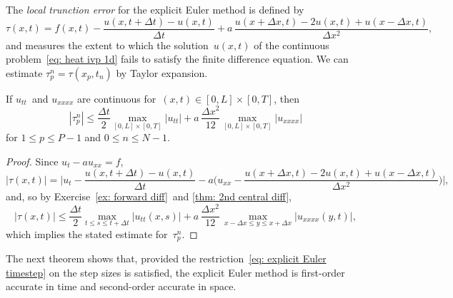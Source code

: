 The \emph{local trunction error} for the explicit Euler method is defined by
\begin{equation}\label{eq: tau explicit Euler}
\tau(x,t)=f(x,t)-\frac{u(x,t+\Delta t)-u(x,t)}{\Delta t}
	+a\,\frac{u(x+\Delta x,t)-2u(x,t)+u(x-\Delta x,t)}{\Delta x^2},
\end{equation}
and measures the extent to which the solution~$u(x,t)$ of the continuous 
problem~\eqref{eq: heat ivp 1d} fails to satisfy the finite difference equation.
We can estimate $\tau^n_p=\tau(x_p,t_n)$ by Taylor expansion.

\begin{lemma}\label{lem: tau explicit Euler}
If $u_{tt}$~and $u_{xxxx}$ are continuous for~$(x,t)\in[0,L]\times[0,T]$, then
\[
|\tau^n_p|\le\frac{\Delta t}{2}\max_{[0,L]\times[0,T]}|u_{tt}|
	+a\,\frac{\Delta x^2}{12}\max_{[0,L]\times[0,T]}|u_{xxxx}|
\]
for $1\le p\le P-1$ and $0\le n\le N-1$.
\end{lemma}
\begin{proof}
Since $u_t-au_{xx}=f$,
\[
|\tau(x,t)|=\biggl|u_t-\frac{u(x,t+\Delta t)-u(x,t)}{\Delta t}
	-a\biggl(u_{xx}-\frac{u(x+\Delta x,t)-2u(x,t)+u(x-\Delta x,t)}{\Delta x^2}
\biggr)\biggr|,
\]
and, so by Exercise~\ref{ex: forward diff}~and \cref{thm: 2nd central diff},
\[
|\tau(x,t)|\le\frac{\Delta t}{2}\max_{t\le s\le t+\Delta t}|u_{tt}(x,s)|
	+a\,\frac{\Delta x^2}{12}\,
	\max_{x-\Delta x\le y\le x+\Delta x}|u_{xxxx}(y,t)|,
\]
which implies the stated estimate for~$\tau^n_p$. 
\end{proof}

The next theorem shows that, provided the 
restriction~\eqref{eq: explicit Euler timestep} on the step sizes is satisfied, 
the explicit Euler method is first-order accurate in time and second-order 
accurate in space.

